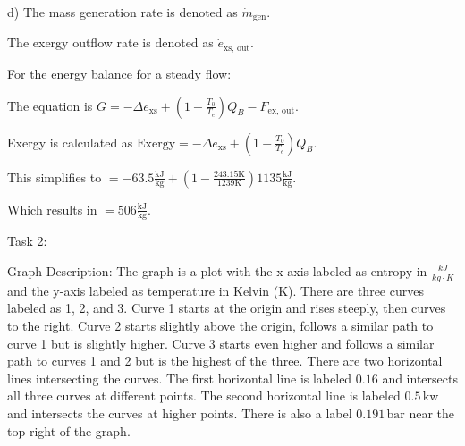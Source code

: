 d) The mass generation rate is denoted as \( \dot{m}_{\text{gen}} \).

The exergy outflow rate is denoted as \( \dot{e}_{\text{xs, out}} \).

For the energy balance for a steady flow:

The equation is \( G = -\Delta e_{\text{xs}} + \left( 1 - \frac{T_0}{T_e} \right) Q_B - F_{\text{ex, out}} \).

Exergy is calculated as \( \text{Exergy} = -\Delta e_{\text{xs}} + \left( 1 - \frac{T_0}{T_e} \right) Q_B \).

This simplifies to \( = -63.5 \frac{\text{kJ}}{\text{kg}} + \left( 1 - \frac{243.15 \text{K}}{1239 \text{K}} \right) 1135 \frac{\text{kJ}}{\text{kg}} \).

Which results in \( = 506 \frac{\text{kJ}}{\text{kg}} \).

Task 2:

Graph Description: The graph is a plot with the x-axis labeled as entropy in \( \frac{kJ}{kg \cdot K} \) and the y-axis labeled as temperature in Kelvin (K). There are three curves labeled as 1, 2, and 3. Curve 1 starts at the origin and rises steeply, then curves to the right. Curve 2 starts slightly above the origin, follows a similar path to curve 1 but is slightly higher. Curve 3 starts even higher and follows a similar path to curves 1 and 2 but is the highest of the three. There are two horizontal lines intersecting the curves. The first horizontal line is labeled \(0.16\) and intersects all three curves at different points. The second horizontal line is labeled \(0.5 \, \text{kw}\) and intersects the curves at higher points. There is also a label \(0.191 \, \text{bar}\) near the top right of the graph.